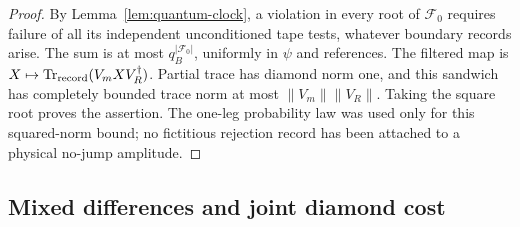 \begin{proof}
By Lemma~\ref{lem:quantum-clock}, a violation in every
root of \(\mathcal F_0\) requires failure of all its
independent unconditioned tape tests, whatever boundary
records arise. The sum is at most \(q_B^{|\mathcal F_0|}\),
uniformly in \(\psi\) and references.
The filtered map is
\(X\mapsto\operatorname{Tr}_{\rm record}(V_m X V_R^\dagger)\).
Partial trace has diamond norm one, and this sandwich
has completely bounded trace norm at most
\(\|V_m\|\|V_R\|\).
Taking the square root proves the assertion.
The one-leg probability law was used only for this
squared-norm bound; no fictitious rejection record has
been attached to a physical no-jump amplitude.
\end{proof}

\subsection{Mixed differences and joint diamond cost}

